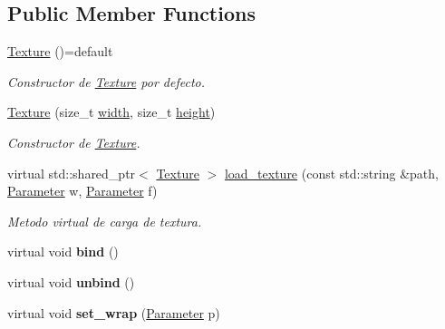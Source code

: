 \subsection*{Public Member Functions}
\begin{DoxyCompactItemize}
\item 
\mbox{\hyperlink{classexample_1_1_texture_a049d061c48276bea0627a1377cb0f2c6}{Texture}} ()=default
\begin{DoxyCompactList}\small\item\em Constructor de \mbox{\hyperlink{classexample_1_1_texture}{Texture}} por defecto. \end{DoxyCompactList}\item 
\mbox{\hyperlink{classexample_1_1_texture_ab23b9a71fef15550591dd458a17eaad5}{Texture}} (size\+\_\+t \mbox{\hyperlink{classexample_1_1_texture_a7145084592702dbfc07a914186a9bfd5}{width}}, size\+\_\+t \mbox{\hyperlink{classexample_1_1_texture_a5d5d9fca80c49b9b7c5c5c8adaf0f360}{height}})
\begin{DoxyCompactList}\small\item\em Constructor de \mbox{\hyperlink{classexample_1_1_texture}{Texture}}. \end{DoxyCompactList}\item 
virtual std\+::shared\+\_\+ptr$<$ \mbox{\hyperlink{classexample_1_1_texture}{Texture}} $>$ \mbox{\hyperlink{classexample_1_1_texture_abc652f37394b62296b76d933feb9cbdc}{load\+\_\+texture}} (const std\+::string \&path, \mbox{\hyperlink{classexample_1_1_texture_a4f7233e69c4a5b913dbe53d729c1765f}{Parameter}} w, \mbox{\hyperlink{classexample_1_1_texture_a4f7233e69c4a5b913dbe53d729c1765f}{Parameter}} f)
\begin{DoxyCompactList}\small\item\em Metodo virtual de carga de textura. \end{DoxyCompactList}\item 
\mbox{\label{classexample_1_1_texture_aa94c59f3c0abc6abb366b13fe4d66983}} 
virtual void {\bfseries bind} ()
\item 
\mbox{\label{classexample_1_1_texture_aebf37fc64e24abd3357d7fa534ca7ab7}} 
virtual void {\bfseries unbind} ()
\item 
\mbox{\label{classexample_1_1_texture_aa9f5a727ebf962a89f7a3ab18198de74}} 
virtual void {\bfseries set\+\_\+wrap} (\mbox{\hyperlink{classexample_1_1_texture_a4f7233e69c4a5b913dbe53d729c1765f}{Parameter}} p)

\end{DoxyCompactItemize}
